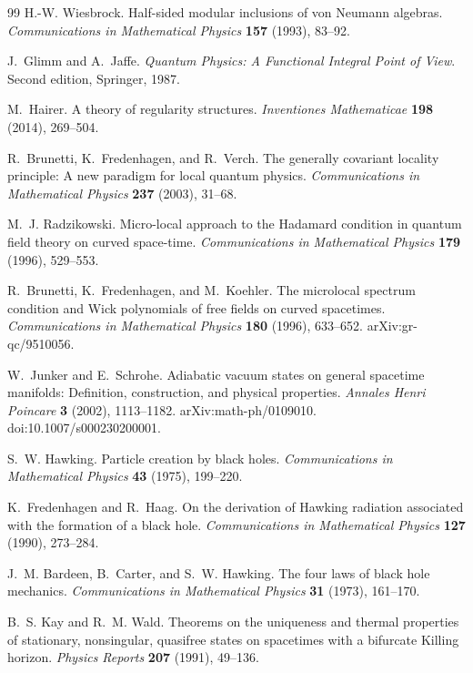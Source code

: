 \begin{thebibliography}{99}
H.-W. Wiesbrock.
Half-sided modular inclusions of von Neumann algebras.
\emph{Communications in Mathematical Physics} \textbf{157} (1993), 83--92.

J.~Glimm and A.~Jaffe.
\emph{Quantum Physics: A Functional Integral Point of View}.
Second edition, Springer, 1987.

M.~Hairer.
A theory of regularity structures.
\emph{Inventiones Mathematicae} \textbf{198} (2014), 269--504.

R.~Brunetti, K.~Fredenhagen, and R.~Verch.
The generally covariant locality principle: A new paradigm for local quantum
physics.
\emph{Communications in Mathematical Physics} \textbf{237} (2003), 31--68.

M.~J. Radzikowski.
Micro-local approach to the Hadamard condition in quantum field theory on
curved space-time.
\emph{Communications in Mathematical Physics} \textbf{179} (1996), 529--553.

R.~Brunetti, K.~Fredenhagen, and M.~Koehler.
The microlocal spectrum condition and Wick polynomials of free fields on
curved spacetimes.
\emph{Communications in Mathematical Physics} \textbf{180} (1996), 633--652.
arXiv:gr-qc/9510056.

W.~Junker and E.~Schrohe.
Adiabatic vacuum states on general spacetime manifolds: Definition,
construction, and physical properties.
\emph{Annales Henri Poincare} \textbf{3} (2002), 1113--1182.
arXiv:math-ph/0109010.
doi:10.1007/s000230200001.

S.~W. Hawking.
Particle creation by black holes.
\emph{Communications in Mathematical Physics} \textbf{43} (1975), 199--220.

K.~Fredenhagen and R.~Haag.
On the derivation of Hawking radiation associated with the formation of a
black hole.
\emph{Communications in Mathematical Physics} \textbf{127} (1990), 273--284.

J.~M. Bardeen, B.~Carter, and S.~W. Hawking.
The four laws of black hole mechanics.
\emph{Communications in Mathematical Physics} \textbf{31} (1973), 161--170.

B.~S. Kay and R.~M. Wald.
Theorems on the uniqueness and thermal properties of stationary, nonsingular,
quasifree states on spacetimes with a bifurcate Killing horizon.
\emph{Physics Reports} \textbf{207} (1991), 49--136.


\end{thebibliography}
